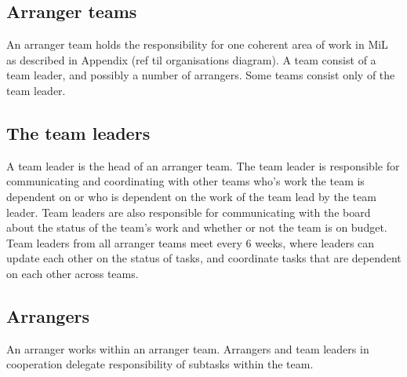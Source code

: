 \subsection{Arranger teams} %
\label{sub:arranger_team}
An arranger team holds the responsibility for one coherent area of work in MiL as described in Appendix (ref til organisations diagram). A team consist of a team leader, and possibly a number of arrangers. Some teams consist only of the team leader.

\subsection{The team leaders}
\label{sub:team_leaders}
A team leader is the head of an arranger team. The team leader is responsible for communicating and coordinating with other teams who's work the team is dependent on or who is dependent on the work of the team lead by the team leader. Team leaders are also responsible for communicating with the board about the status of the team's work and whether or not the team is on budget. Team leaders from all arranger teams meet every 6 weeks, where leaders can update each other on the status of tasks, and coordinate tasks that are dependent on each other across teams.

\subsection{Arrangers}
\label{sub:team_members}
An arranger works within an arranger team. Arrangers and team leaders in cooperation delegate responsibility of subtasks within the team.

